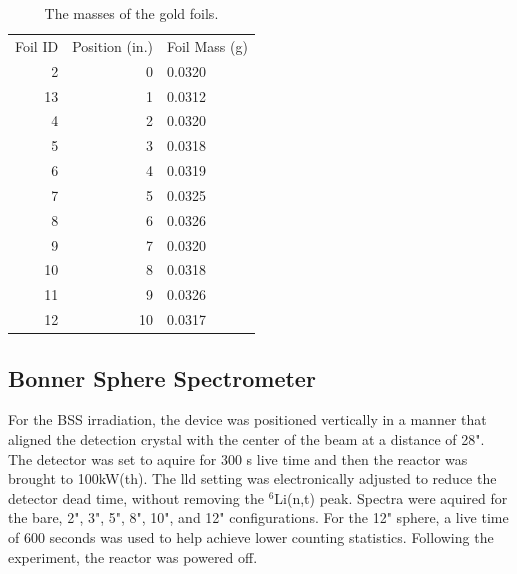 \begin{table}[h]\centering
\label{tab:au_masses}
\caption{The masses of the gold foils.}
\begin{tabular}{ r | r | l }
\toprule
Foil ID  & Position (in.)     &   Foil Mass (g)\\
2 & 0 & 0.0320\\
13 & 1 & 0.0312\\
4 & 2 & 0.0320\\
5 & 3 & 0.0318\\
6 & 4 & 0.0319\\
7 & 5 & 0.0325\\
8 & 6 & 0.0326\\
9 & 7 & 0.0320\\
10 & 8 & 0.0318\\
11 & 9 & 0.0326\\
12 & 10 & 0.0317\\
\end{tabular}
\end{table}

\subsection{Bonner Sphere Spectrometer}

For the BSS irradiation, the device was positioned vertically in a manner that aligned the detection crystal with the center of the beam at a distance of 28".
The detector was set to aquire for 300 s live time and then the reactor was brought to 100kW(th).
The lld setting was electronically adjusted to reduce the detector dead time, without removing the $^6$Li(n,t) peak.
Spectra were aquired for the bare, 2", 3", 5", 8", 10", and 12" configurations.
For the 12" sphere, a live time of 600 seconds was used to help achieve lower counting statistics.
Following the experiment, the reactor was powered off.





